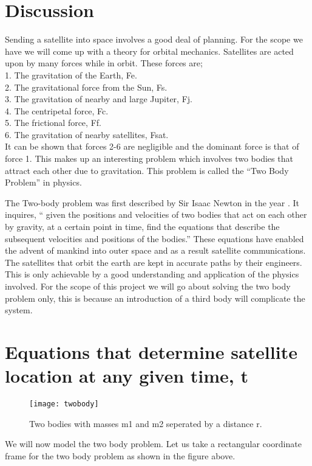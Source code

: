 \section{Discussion}
Sending a satellite into space involves a good deal of planning. For the scope we have we will come up with a theory for orbital mechanics. Satellites are acted upon by many forces while in orbit. These forces are; \\
1. The gravitation of the Earth, Fe.\\
2. The gravitational force from the Sun, Fs.\\
3. The gravitation of nearby and large Jupiter, Fj.\\
4. The centripetal force, Fc.\\
5. The frictional force, Ff.\\
6. The gravitation of nearby satellites, Fsat.\\


It can be shown that forces 2-6 are negligible and the dominant force is that of force 1. This makes up an interesting problem which involves two bodies that attract each other due to gravitation. This problem is called the “Two Body Problem” in physics.

The Two-body problem was first described by Sir Isaac Newton in the year . It inquires,  “ given the positions and velocities of two bodies that act on each other by gravity, at a certain point in time, find the equations that describe the subsequent velocities and positions of the bodies.”
These equations have enabled the advent of mankind into outer space and as a result satellite communications. The satellites that orbit the earth are kept in accurate paths by their engineers. This is only achievable by a good understanding and application of the physics involved. For the scope of this project we will go about solving the two body problem only, this is because an introduction of a third body will complicate the system.\\

\vspace{4cm}
\section{Equations that determine satellite location at any given time, t}
\begin{figure}[h]
	\centering
	\texttt{[image: twobody]}
	\caption{Two bodies with masses m1 and m2 seperated by a distance r.}
	\label{fig:two-body problem}
\end{figure}
We will now model the two body problem. Let us take a rectangular coordinate frame for the two body problem as shown in the figure above.
\\


